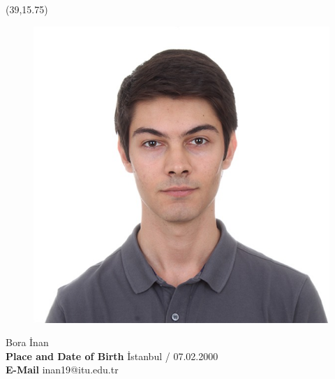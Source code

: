 \vspace*{10mm}
\setlength{\TPHorizModule}{10pt}
\setlength{\TPVertModule}{10pt}
\begin{textblock}{1}(39,15.75) %
	\begin{figure}[p]
		\includegraphics[scale=0.2,keepaspectratio=true]{cv-photo/bora.jpeg}
	\end{figure}	
\end{textblock}
\vspace*{20mm}
\textbf{\makebox[1.6cm]{\hfill \textbf{:}}}\hspace{0.225em} Bora İnan \\ %

\textbf{Place and Date of Birth\makebox[0.735cm]{\hfill \textbf{:}}}\hspace{0.225em} İstanbul / 07.02.2000\\ %

\textbf{E-Mail\makebox[3.685cm]{\hfill \textbf{:}}}\hspace{0.225em} inan19@itu.edu.tr\\ %

\vspace{5mm}

